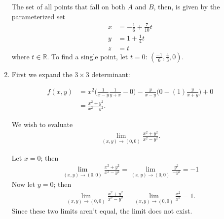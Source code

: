 \documentclass{article}
\begin{document}
\begin{enumerate}
The set of all points that fall on both $A$ and $B$, then, is
given by the parameterized set
\begin{align*}
 x &= -\frac{1}{6} + \frac{7}{10}t \\
 y &= 1 + \frac{1}{4}t \\
 z &= t
\end{align*}
where $t \in \mathbb{R}$.  To find a single point, let $t = 0$:
$(\frac{-1}{6}, \frac{4}{3}, 0)$.

\item %
First we expand the $3\times3$ determinant:

\begin{align*}
 f(x,y) &= x^2 \Big(\frac{1}{x-y} \frac{1}{y+x} - 0\Big) - \frac{y}{x-y} \Big(0 - (1) \frac{y}{x+y} \Big) + 0 \\
 &= \frac{x^2 + y^2}{x^2 - y^2}.
\end{align*}

We wish to evaluate 
\begin{align*} 
  \lim\limits_{(x,y) \to (0,0)} \frac{x^2 + y^2}{x^2 - y^2}.
\end{align*}

Let $x = 0$; then 
\begin{align*} 
  \lim\limits_{(x,y) \to (0,0)} \frac{x^2 + y^2}{x^2 - y^2} = \lim\limits_{(x,y) \to (0,0)} \frac{y^2}{-y^2} = -1
\end{align*}
Now let $y = 0$; then 
\begin{align*}
   \lim\limits_{(x,y) \to (0,0)} \frac{x^2 + y^2}{x^2 - y^2} = \lim\limits_{(x,y) \to (0,0)} \frac{x^2}{x^2} = 1.
\end{align*}
Since these two limits aren't equal, the limit does not exist.


\end{enumerate}
\end{document}
